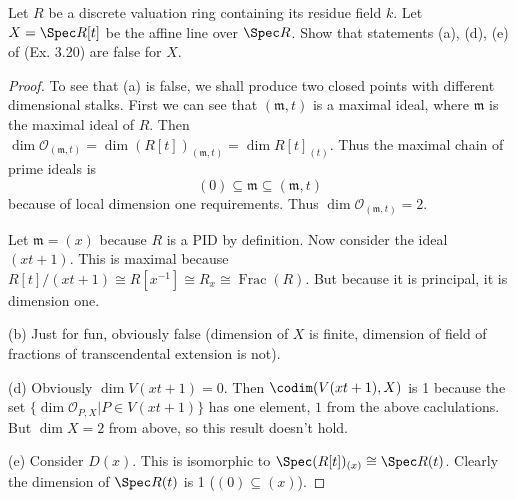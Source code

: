 \begin{exercise}
	Let $R $ be a discrete valuation ring containing its residue field $k $. Let $X = \Spec R[t]$ be the affine line over $\Spec R $. Show that statements (a), (d), (e) of (Ex. 3.20) are false for $X $.
\end{exercise}
\begin{proof}
	To see that (a) is false, we shall produce two closed points with different dimensional stalks.
	First we can see that $(\mathfrak{m},t) $ is a maximal ideal, where $\mathfrak{m} $ is the maximal ideal of $R $.
	Then $\dim \mathcal{O}_{(\mathfrak{m},t)} = \dim (R[t])_{(\mathfrak{m},t)} = \dim R[t]_{(t)}$.
	Thus the maximal chain of prime ideals is
	\[
		(0) \subseteq \mathfrak{m} \subseteq (\mathfrak{m},t)
	\]
	because of local dimension one requirements.
	Thus $\dim \mathcal{O}_{(\mathfrak{m},t)} = 2 $.

	Let $\mathfrak{m} = (x) $ because $R $ is a PID by definition.
	Now consider the ideal $(xt+1) $.
	This is maximal because $R[t] / (xt+1) \cong R[x^{-1}] \cong R_x \cong \operatorname{Frac}(R) $.
	But because it is principal, it is dimension one.

	(b) Just for fun, obviously false (dimension of $X $ is finite, dimension of field of fractions of transcendental extension is not).

	(d) Obviously $\dim V(xt+1) = 0 $.
	Then $\codim(V(xt+1),X) $ is 1 because the set $\{\dim \mathcal{O}_{P,X}|P\in V(xt+1)\}   $ has one element, $1 $ from the above caclulations.
	But $\dim X = 2 $ from above, so this result doesn't hold.

	(e) Consider $D(x) $.
	This is isomorphic to $\Spec (R[t])_{(x)} \cong \Spec R(t) $.
	Clearly the dimension of $\Spec R(t) $ is 1 ($(0) \subseteq (x) $).
\end{proof}

